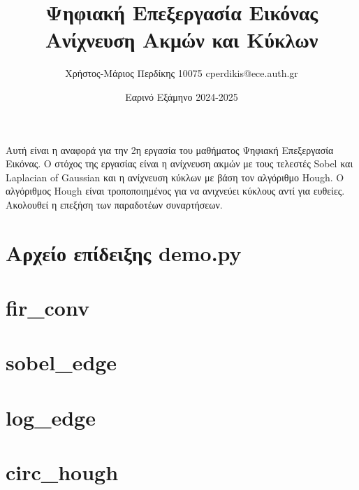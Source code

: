 \documentclass{article}
\title{Ψηφιακή Επεξεργασία Εικόνας \\ Ανίχνευση Ακμών και Κύκλων}
\date{Εαρινό Εξάμηνο 2024-2025}
\author{Χρήστος-Μάριος Περδίκης 10075 cperdikis@ece.auth.gr}
\begin{document}
\maketitle

Αυτή είναι η αναφορά για την 2η εργασία του μαθήματος Ψηφιακή Επεξεργασία 
Εικόνας. Ο στόχος της εργασίας είναι η ανίχνευση ακμών με τους τελεστές Sobel
και Laplacian of Gaussian και η ανίχνευση κύκλων με βάση τον αλγόριθμο Hough.
O αλγόριθμος Hough είναι τροποποιημένος για να ανιχνεύει κύκλους αντί για 
ευθείες. Ακολουθεί η επεξήση των παραδοτέων συναρτήσεων.

\section{Αρχείο επίδειξης demo.py}

\section{fir\_conv}

\section{sobel\_edge}

\section{log\_edge}

\section{circ\_hough}
\end{document}
